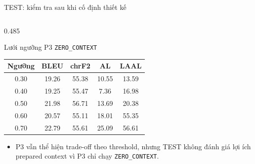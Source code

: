\documentclass[aspectratio=169,11pt]{beamer}
\newcommand{\contextzero}{\texttt{ZERO\_CONTEXT}}
\begin{document}
\begin{frame}{TEST: kiểm tra sau khi cố định thiết kế}
\begin{columns}[T,onlytextwidth]
    \begin{column}{0.485\textwidth}
      \begin{block}{Lưới ngưỡng P3 \contextzero{}}
        \centering\scriptsize
        \begin{tabular}{ccccc}
          \toprule
          Ngưỡng & BLEU & chrF2 & AL & LAAL \\
          \midrule
          0.30 & 19.26 & 55.38 & 10.55 & 13.59 \\
          0.40 & 19.25 & 55.47 & 7.36 & 16.98 \\
          0.50 & 21.98 & 56.71 & 13.69 & 20.38 \\
          0.60 & 20.57 & 55.11 & 18.01 & 55.35 \\
          0.70 & 22.79 & 55.61 & 25.09 & 56.61 \\
          \bottomrule
        \end{tabular}
      \end{block}
      \vspace{0.1em}
      \scriptsize
      \begin{itemize}
        \setlength\itemsep{0.15em}
        \item P3 vẫn thể hiện trade-off theo threshold, nhưng TEST không đánh giá lợi ích prepared context vì P3 chỉ chạy \contextzero{}.
      \end{itemize}
    \end{column}
  \end{columns}

  \vfill
  \centering\scriptsize\color{TimelyGray}
\end{frame}
\end{document}
